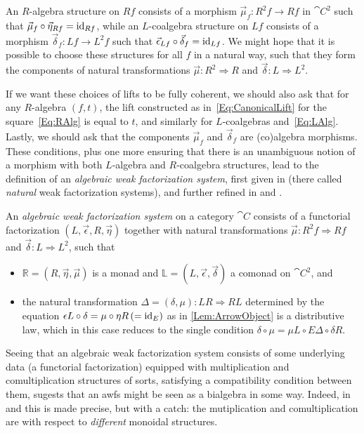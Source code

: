 An $R$-algebra structure on $Rf$ consists of a morphism $\vec{\mu}_f\colon R^2f\to Rf$ in $\cat{C}^2$ such that $\vec{\mu}_f\circ\vec{\eta}_{Rf}=\operatorname{id}_{Rf}$, while an $L$-coalgebra structure on $Lf$ consists of a morphism $\vec{\delta}_f\colon Lf\to L^2f$ such that $\vec{\epsilon}_{Lf}\circ\vec{\delta}_f=\operatorname{id}_{Lf}$. We might hope that it is possible to choose these structures for all $f$ in a natural way, such that they form the components of natural transformations $\vec{\mu}\colon R^2\Rightarrow R$ and $\vec{\delta}\colon L\Rightarrow L^2$.

If we want these choices of lifts to be fully coherent, we should also ask that for any $R$-algebra $(f,t)$, the lift constructed as in~\eqref{Eq:CanonicalLift} for the square~\eqref{Eq:RAlg} is equal to $t$, and similarly for $L$-coalgebras and~\eqref{Eq:LAlg}. Lastly, we should ask that the components $\vec{\mu}_f$ and $\vec{\delta}_f$ are (co)algebra morphisms. These conditions, plus one more ensuring that there is an unambiguous notion of a morphism with both $L$-algebra and $R$-coalgebra structures, lead to the definition of an \emph{algebraic weak factorization system}, first given in \cite{gt:nwfs} (there called \emph{natural} weak factorization systems), and further refined in \cite{garner:nwfs} and \cite{garner:soa}.

\begin{definition}\label{Def:Awfs}
	An \emph{algebraic weak factorization system} on a category $\cat{C}$ consists of a functorial factorization $(L,\vec{\epsilon},R,\vec{\eta})$ together with natural transformations $\vec{\mu}\colon R^2f\Rightarrow Rf$ and $\vec{\delta}\colon L\Rightarrow L^2$, such that
	\begin{itemize}
		\item $\mathbb{R}=(R,\vec{\eta},\vec{\mu})$ is a monad and $\mathbb{L}=(L,\vec{\epsilon},\vec{\delta})$ a comonad on $\cat{C}^2$, and
		\item the natural transformation $\Delta=(\delta,\mu)\colon LR\Rightarrow RL$ determined by the equation $\epsilon L\circ\delta=\mu\circ\eta R \, (=\operatorname{id}_E)$ as in \cref{Lem:ArrowObject} is a distributive law, which in this case reduces to the single condition $\delta\circ\mu = \mu L\circ E\Delta\circ\delta R$.
	\end{itemize}
\end{definition}

Seeing that an algebraic weak factorization system consists of some underlying data (a functorial factorization) equipped with multiplication and comultiplication structures of sorts, satisfying a compatibility condition between them, sugests that an awfs might be seen as a bialgebra in some way. Indeed, in \cite{garner:nwfs} and \cite{garner:soa} this is made precise, but with a catch: the mutiplication and comultiplication are with respect to \emph{different} monoidal structures.

